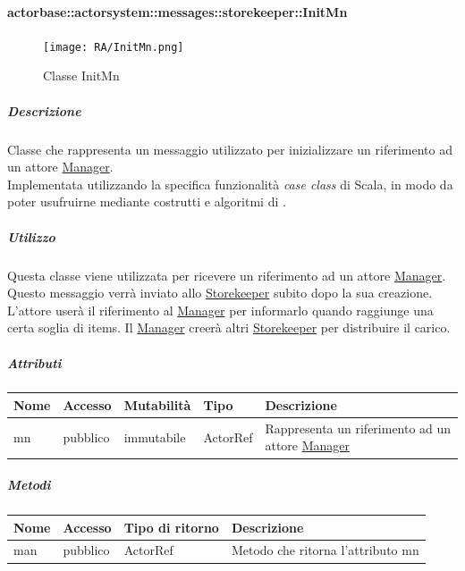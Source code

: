 \documentclass{scalatekids-article}
\begin{document}
\paragraph{actorbase::actorsystem::messages::storekeeper::InitMn}
\label{sec:actorbase::actorsystem::messages::storekeeper::InitMn}

\begin{figure}[H]
  \begin{center}
    \texttt{[image: RA/InitMn.png]}
    \caption{Classe InitMn}
  \end{center}
\end{figure}

\subparagraph{Descrizione}
Classe che rappresenta un messaggio utilizzato per inizializzare un riferimento ad un attore \hyperref[sec:actorbase::actorsystem::actors::manager::Manager]{Manager}.\\Implementata utilizzando la specifica funzionalità \textit{case class} di Scala,
in modo da poter usufruirne mediante costrutti e algoritmi di
.

\subparagraph{Utilizzo}
Questa classe viene utilizzata per ricevere un riferimento ad un attore
\hyperref[sec:actorbase::actorsystem::actors::manager::Manager]{Manager}.
Questo messaggio verrà inviato allo \hyperref[sec:actorbase::actorsystem::actors::storekeeper::Storekeeper]{Storekeeper}
subito dopo la sua creazione.\\L'attore userà il riferimento al \hyperref[sec:actorbase::actorsystem::actors::manager::Manager]{Manager} per
informarlo quando raggiunge una certa soglia di items. Il \hyperref[sec:actorbase::actorsystem::actors::manager::Manager]{Manager} creerà altri
\hyperref[sec:actorbase::actorsystem::actors::storekeeper::Storekeeper]{Storekeeper} per distribuire il carico.

\subparagraph{Attributi}
\begin{tabular}{| p{2cm} | p{1.5cm} | p{2cm} | p{3cm} | p{8.5cm} |}
  \hline
  Nome & Accesso & Mutabilità & Tipo & Descrizione\\
  \hline
  mn & pubblico & immutabile & ActorRef & Rappresenta un riferimento ad un attore \hyperref[sec:actorbase::actorsystem::actors::manager::Manager]{Manager}\\
  \hline
\end{tabular}

\subparagraph{Metodi}
\begin{tabular}{| l | l | l | l |}
  \hline
  Nome & Accesso & Tipo di ritorno & Descrizione\\
  \hline
  man & pubblico & ActorRef & Metodo che ritorna l'attributo mn\\
  \hline
\end{tabular}
\end{document}
